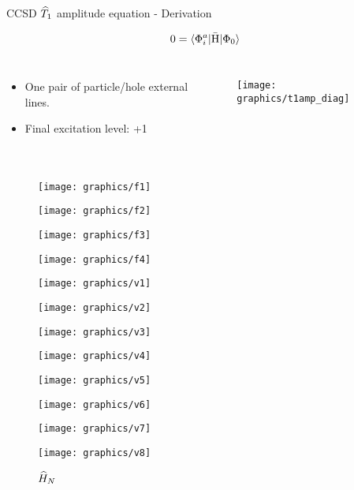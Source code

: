 \begin{frame}{CCSD $\widehat{T}_1$ amplitude equation - Derivation }

    \small
    \begin{equation*}
        0 = \langle\Phi_i^a| \bar{\mathrm{H}} |\Phi_0\rangle
    \end{equation*}
    \begin{columns}
    \begin{itemize}
        \item One pair of particle/hole  external lines.
        \item Final excitation level: +1
    \end{itemize}
    \begin{figure}
        \centering
        \texttt{[image: graphics/t1amp\_diag]}
    \end{figure}
    \end{columns}
    \renewcommand{\figurename}{Elements}
    \begin{columns}[t]
    \begin{figure}
        \caption{$\widehat{H}_N$}
        \centering
        \parbox{0.20\textwidth}{
            \centering
            \texttt{[image: graphics/f1]}} 
        \parbox{0.20\textwidth}{
            \centering
            \texttt{[image: graphics/f2]}} 
        \parbox{0.20\textwidth}{
            \centering
            \texttt{[image: graphics/f3]}} 
        \parbox{0.20\textwidth}{
            \centering
            \texttt{[image: graphics/f4]}} 
        \parbox{0.20\textwidth}{
            \centering
            \texttt{[image: graphics/v1]}} 
        \parbox{0.20\textwidth}{
            \centering
            \texttt{[image: graphics/v2]}} 
        \parbox{0.20\textwidth}{
            \centering
            \texttt{[image: graphics/v3]}} 
        \parbox{0.20\textwidth}{
            \centering
            \texttt{[image: graphics/v4]}} 
        \parbox{0.20\textwidth}{
            \centering
            \texttt{[image: graphics/v5]}} 
        \parbox{0.20\textwidth}{
            \centering
            \texttt{[image: graphics/v6]}} 
        \parbox{0.20\textwidth}{
            \centering
            \texttt{[image: graphics/v7]}} 
        \parbox{0.20\textwidth}{
            \centering
            \texttt{[image: graphics/v8]}} 

\end{figure}
\end{columns}
\end{frame}
